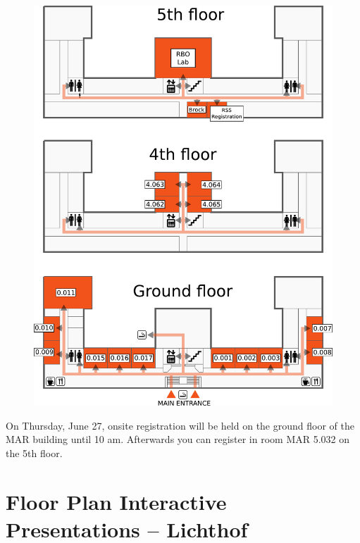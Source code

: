 \begin{figure}[h!]
\center
\includegraphics[height=0.8\textheight]{local_img/maps/MAR_booklet}
\end{figure}

\vspace{1.0cm}
{On Thursday, June 27, onsite registration will be held on the ground floor of the MAR building until 10 am.  Afterwards you can register in room MAR 5.032 on the 5th floor.}

\clearpage

 \section{Floor Plan Interactive Presentations -- Lichthof}

